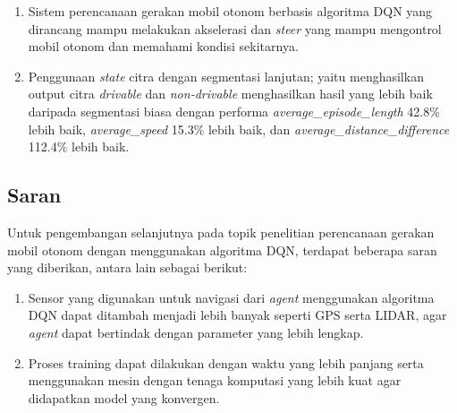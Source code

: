 \documentclass[conference]{IEEEtran}
\begin{document}
	\begin{enumerate}
		
		\item Sistem perencanaan gerakan mobil otonom berbasis algoritma DQN yang dirancang mampu melakukan akselerasi dan \textit{steer} yang mampu mengontrol mobil otonom dan memahami kondisi sekitarnya.
		
		\item Penggunaan \textit{state } citra dengan segmentasi lanjutan; yaitu menghasilkan output citra \textit{drivable }dan \textit{non-drivable} menghasilkan hasil yang lebih baik daripada segmentasi biasa dengan performa \textit{average\_episode\_length} 42.8\% lebih baik, \textit{average\_speed} 15.3\% lebih baik, dan \textit{average\_distance\_difference} 112.4\% lebih baik.
		
	\end{enumerate}
	
	\subsection{Saran}
	\label{chap:saran}
	
	Untuk pengembangan selanjutnya pada topik penelitian perencanaan gerakan mobil otonom dengan menggunakan algoritma DQN, terdapat beberapa saran yang diberikan, antara lain sebagai berikut:
	
	\begin{enumerate}
		
		\item Sensor yang digunakan untuk navigasi dari \textit{agent }menggunakan algoritma DQN dapat ditambah menjadi lebih banyak seperti GPS serta LIDAR, agar \textit{agent} dapat bertindak dengan parameter yang lebih lengkap.
		
		\item Proses training dapat dilakukan dengan waktu yang lebih panjang serta menggunakan mesin dengan tenaga komputasi yang lebih kuat agar didapatkan model yang konvergen.
	\end{enumerate}
	
	
	
\end{document}
